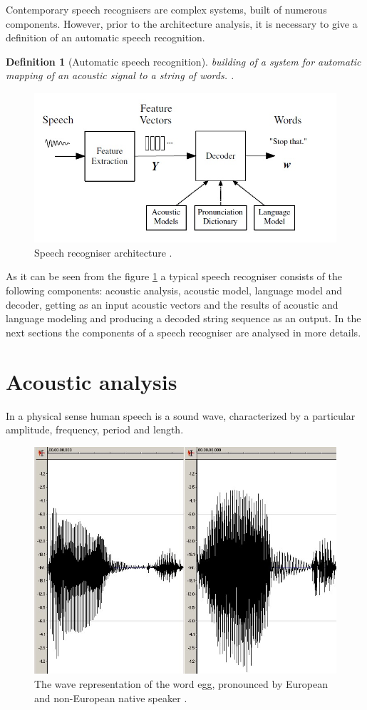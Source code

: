 \documentclass[11pt,a4paper]{report}
\newtheorem{definition}[theorem]{Definition}
\begin{document}
Contemporary speech recognisers are complex systems, built of
numerous components. However, prior to the architecture analysis, it is necessary to give
a definition of an automatic speech recognition. \begin {definition}[Automatic speech recognition] building of a
system for automatic mapping of an acoustic signal to a string of words. \citep
{jurafsky-martin-2009}.
\end{definition}
\begin  {figure}[h]
\begin {center}
     \includegraphics[height=6.0 cm]{arc2}
     \caption {Speech recogniser architecture \citep {Gales2008application}.}
     \label {fig:arc}
     \end {center}
     \end {figure}

As it can be seen from the figure \ref{fig:arc} a typical
speech recogniser consists of the following components: acoustic analysis, acoustic model,
language model and decoder, getting as an input acoustic vectors and the results
of acoustic and language modeling and producing a decoded string sequence as
an output.  In the next sections the components of a speech recogniser are
analysed in more details. 

\section {Acoustic analysis}
In a physical sense human speech is a sound wave, characterized by a
particular amplitude, frequency, period and length. 
\begin  {figure} [h]
\begin {center}
     \includegraphics[height=5.0 cm]{egg}
     \caption {The wave representation of the word egg, pronounced by European
     and non-European native speaker \citep{SpeechRecognition}.}
     \label {fig:egg}
     \end {center}
     \end {figure}
\end{document}
